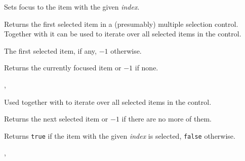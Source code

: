 \label{wxlistviewfocus}


Sets focus to the item with the given {\it index}.


\label{wxlistviewgetfirstselected}


Returns the first selected item in a (presumably) multiple selection control.
Together with  it can be
used to iterate over all selected items in the control.


The first selected item, if any, $-1$ otherwise.


\label{wxlistviewgetfocuseditem}


Returns the currently focused item or $-1$ if none.


,\\


\label{wxlistviewgetnextselected}


Used together with  to
iterate over all selected items in the control.


Returns the next selected item or $-1$ if there are no more of them.


\label{wxlistviewisselected}


Returns {\tt true} if the item with the given {\it index} is selected, 
{\tt false} otherwise.


,\\


\label{wxlistviewselect}

